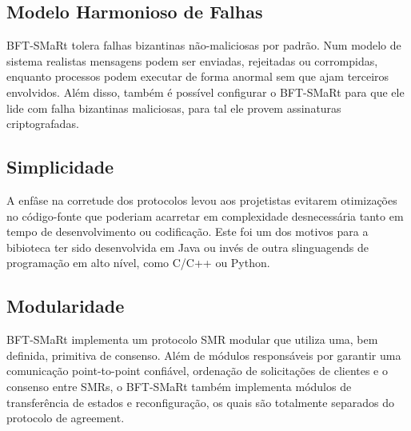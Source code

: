 		\subsection{Modelo Harmonioso de Falhas}
		BFT-SMaRt tolera falhas bizantinas não-maliciosas por padrão. Num modelo de sistema realistas mensagens podem ser enviadas, rejeitadas ou corrompidas, enquanto processos podem executar de forma anormal sem que ajam terceiros envolvidos. Além disso, também é possível configurar o BFT-SMaRt para que ele lide com falha bizantinas maliciosas, para tal ele provem assinaturas criptografadas. \\
		
		\subsection{Simplicidade}
		A enfâse na corretude dos protocolos levou aos projetistas evitarem otimizações no código-fonte que poderiam acarretar em complexidade desnecessária tanto em tempo de desenvolvimento ou codificação. Este foi um dos motivos para a bibioteca ter sido desenvolvida em Java ou invés de outra slinguagends de programação em alto nível, como C/C++ ou Python.\\
		
		\subsection{Modularidade}
		BFT-SMaRt implementa um protocolo SMR modular que utiliza uma, bem definida, primitiva de consenso. Além de módulos responsáveis por garantir uma comunicação point-to-point confiável, ordenação de solicitações de clientes e o consenso entre SMRs, o BFT-SMaRt também implementa módulos de transferência de estados e reconfiguração, os quais são totalmente separados do protocolo de agreement.\\
		

